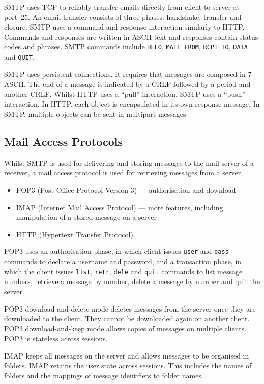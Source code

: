 SMTP uses TCP to reliably transfer emails directly from client to server at port~\num{25}.
An email transfer consists of three phases: handshake, transfer and closure.
SMTP uses a command and response interaction similarly to HTTP.
Commands and responses are written in ASCII text and responses contain status codes and phrases.
SMTP commands include \texttt{HELO}, \texttt{MAIL FROM}, \texttt{RCPT TO}, \texttt{DATA} and \texttt{QUIT}.

SMTP uses persistent connections.
It requires that messages are composed in \SI{7}{\bit} ASCII.
The end of a message is indicated by a CRLF followed by a period and another CRLF.
Whilst HTTP uses a ``pull'' interaction, SMTP uses a ``push'' interaction.
In HTTP, each object is encapsulated in its own response message.
In SMTP, multiple objects can be sent in multipart messages.

\subsection{Mail Access Protocols}

Whilst SMTP is used for delivering and storing messages to the mail server of a receiver, a mail access protocol is used for retrieving messages from a server.
\begin{itemize}
  \item POP3 (Post Office Protocol Version 3) --- authorisation and download
  \item IMAP (Internet Mail Access Protocol) --- more features, including manipulation of a stored message on a server
  \item HTTP (Hypertext Transfer Protocol)
\end{itemize}

POP3 uses an authorisation phase, in which client issues \texttt{user} and \texttt{pass} commands to declare a username and password, and a transaction phase, in which the client issues \texttt{list}, \texttt{retr}, \texttt{dele} and \texttt{quit} commands to list message numbers, retrieve a message by number, delete a message by number and quit the server.

POP3 download-and-delete mode deletes messages from the server once they are downloaded to the client.
They cannot be downloaded again on another client.
POP3 download-and-keep mode allows copies of messages on multiple clients.
POP3 is stateless across sessions.

IMAP keeps all messages on the server and allows messages to be organised in folders.
IMAP retains the user state across sessions.
This includes the names of folders and the mappings of message identifiers to folder names.

